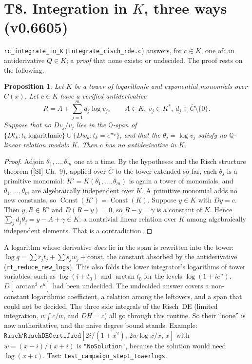\documentclass[11pt]{article}
\newtheorem{proposition}[theorem]{Proposition}
\theoremstyle{definition}
\theoremstyle{remark}
\newcommand{\Q}{\mathbb{Q}}
\newcommand{\code}[1]{\texttt{#1}}
\begin{document}
\section*{T8. Integration in $K$, three ways (v0.6605)}
\label{sec:T8}

\code{rc\_integrate\_in\_K} (\code{integrate\_risch\_rde.c}) answers, for $c\in K$, one of:
an antiderivative $Q\in K$; a \emph{proof} that none exists; or undecided. The proof
rests on the following.

\begin{proposition}\label{prop:T8}
Let $K$ be a tower of logarithmic and exponential monomials over $C(x)$. Let $c\in K$
have a verified antiderivative
\[ R=A+\sum_{j=1}^md_j\log v_j,\qquad A\in K,\ v_j\in K^*,\ d_j\in\overline C\setminus\{0\}. \]
Suppose that no $Dv_j/v_j$ lies in the $\Q$-span of $\{Dt_k: t_k\ \text{logarithmic}\}\cup\{Dw_k: t_k=e^{w_k}\}$,
and that the $\theta_j=\log v_j$ satisfy no $\Q$-linear relation modulo $K$. Then
$c$ has no antiderivative in $K$.
\end{proposition}

\begin{proof}
Adjoin $\theta_1,\dots,\theta_m$ one at a time. By the hypotheses and the Risch
structure theorem ([SI] Ch.~9), applied over $\overline C$ to the tower extended so far,
each $\theta_j$ is a primitive monomial: $K'=K(\theta_1,\dots,\theta_m)$ is again a tower
of monomials, and $\theta_1,\dots,\theta_m$ are algebraically independent over $K$. A
primitive monomial adds no new constants, so $\operatorname{Const}(K')=\operatorname{Const}(K)$.
Suppose $y\in K$ with $Dy=c$. Then $y,R\in K'$ and $D(R-y)=0$, so $R-y=\gamma$ is a
constant of $K$. Hence $\sum_jd_j\theta_j=y-A+\gamma\in K$: a nontrivial linear relation
over $K$ among algebraically independent elements. That is a contradiction.
\end{proof}

A logarithm whose derivative \emph{does} lie in the span is rewritten into the tower:
$\log q=\sum r_jt_j+\sum s_jw_j+\text{const}$, the constant absorbed by the
antiderivative (\code{rt\_reduce\_new\_logs}). This also folds the lower integrator's
logarithms of tower variables, such as $\log(i+t_0)$ and $\arctan t_0$ for the levels
$\log(1\mp ie^u)$. $D[\arctan^3e^u]$ had been undecided. The undecided answer covers
a non-constant logarithmic coefficient, a relation among the leftovers, and a span that
could not be decided. The three side integrals of the Risch~DE (limited integration,
$w\int c/w$, and $DH=c$) all go through this routine. So their ``none'' is now
authoritative, and the naive degree bound stands. Example:
$\code{Risch`RischDECertified}[2i/(1+x^2),\,2w\log x/x,\,x]$ with
$w=(x-i)/(x+i)$ is \code{"NoSolution"}, because the solution would need
$\log(x+i)$. Test: \code{test\_campaign\_step1\_towerlogs}.
\end{document}
